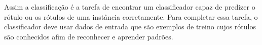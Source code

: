 

Assim a classificação é a tarefa de encontrar um classificador capaz de predizer 
o rótulo ou os rótulos de uma instância corretamente.
Para completar essa tarefa, o classificador deve usar dados de entrada que são exemplos
de treino cujos rótulos são conhecidos afim de
reconhecer e aprender padrões.

